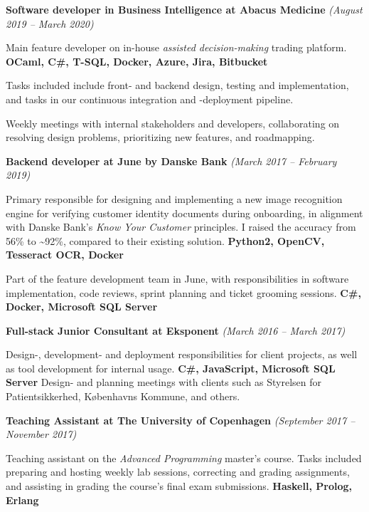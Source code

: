 \documentclass[10pt, a4paper]{article}
\begin{document}
\textbf{Software developer in Business Intelligence at Abacus Medicine} \textit{(August 2019 -- March 2020)}
  \begin{outline}
  \1 Main feature developer on in-house \textit{assisted decision-making} trading platform.\newline
  {\footnotesize \textbf{OCaml, C\#, T-SQL, Docker, Azure, Jira, Bitbucket}}

  \1 Tasks included include front- and backend design, testing and
    implementation, and tasks in our continuous integration and -deployment pipeline.

  \1 Weekly meetings with internal stakeholders and developers, collaborating
    on resolving design problems, prioritizing new features, and roadmapping. 
  \end{outline}

\textbf{Backend developer at June by Danske Bank} \textit{(March 2017 -- February 2019)}
\begin{outline}
  \1 Primary responsible for designing and implementing a new image recognition engine for verifying customer identity documents during onboarding, in alignment with Danske Bank's \textit{Know Your Customer} principles. I raised the accuracy from 56\% to \textasciitilde 92\%, compared to their existing solution.\newline
    {\footnotesize \textbf{Python2, OpenCV, Tesseract OCR, Docker}}

  \1 Part of the feature development team in June, with responsibilities in software implementation, code reviews, sprint planning and ticket grooming sessions.\newline
    {\footnotesize \textbf{C\#, Docker, Microsoft SQL Server}}
\end{outline}

\textbf{Full-stack Junior Consultant at Eksponent} \textit{(March 2016 -- March 2017)}
\begin{outline}
\1 Design-, development- and deployment responsibilities for client projects, as well as tool development for internal usage.\newline
  {\footnotesize \textbf{C\#, JavaScript, Microsoft SQL Server}}
\1 Design- and planning meetings with clients such as Styrelsen for Patientsikkerhed, Københavns Kommune, and others.
\end{outline}

\textbf{Teaching Assistant at The University of Copenhagen} \textit{(September 2017 -- November 2017)}
\begin{outline}
\1 Teaching assistant on the \textit{Advanced Programming} master's course. Tasks included preparing and hosting weekly lab sessions, correcting and grading assignments, and assisting in grading the course's final exam submissions.\newline
  {\footnotesize\textbf{Haskell, Prolog, Erlang}}
\end{outline}
\end{document}
